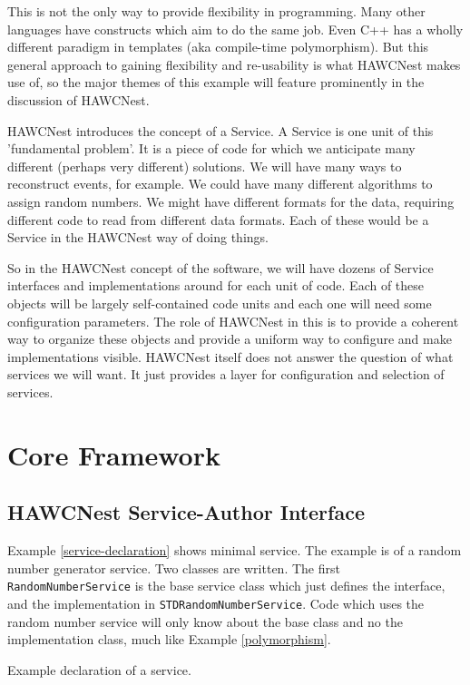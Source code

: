 \documentclass[12pt]{article}
\begin{document}
This is not the only way to provide flexibility in programming.  Many other
languages have constructs which aim to do the same job.  Even C++ has a wholly
different paradigm in templates (aka compile-time polymorphism).  But this
general approach to gaining flexibility and re-usability is what HAWCNest
makes use of, so the major themes of this example will feature 
prominently in the discussion of HAWCNest.

HAWCNest introduces the concept of a Service.  A Service is one unit of this
'fundamental problem'.  It is a piece of code for which we anticipate many
different (perhaps very different) solutions.  We will have many ways to 
reconstruct events, for example.  We could have many different algorithms
to assign random numbers.  We might have different formats for the data,
requiring different code to read from different data formats.  Each of these
would be a Service in the HAWCNest way of doing things.

So in the HAWCNest concept of the software, we will have dozens of Service
interfaces and implementations around for each unit of code.  Each of these
objects will be largely self-contained code units and each one will need
some configuration parameters.  The role of HAWCNest in this is to provide
a coherent way to organize these objects and provide a uniform way to 
configure and make implementations visible.  HAWCNest itself does not answer
the question of what services we will want.  It just provides a layer
for configuration and selection of services.

\section{Core Framework}

\subsection{HAWCNest Service-Author Interface}
\label{saisection}

Example \ref{service-declaration} shows minimal service.  The example is 
of a random number generator service.  Two classes are written.  The first
{\tt RandomNumberService} is the base service class which just defines the 
interface, and the implementation in {\tt STDRandomNumberService}.  
Code which uses the random number service will only know about the base 
class and no the implementation class, much like Example
\ref{polymorphism}.  

\begin{example}

\caption{Example declaration of a service.}
\label{service-declaration}
\end{example}
\end{document}
